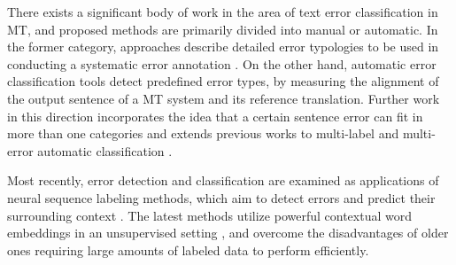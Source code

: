 There exists a significant body of work in the area of text error classification in MT, and proposed methods are primarily divided into manual or automatic. In the former category, approaches describe detailed error typologies to be used in conducting a systematic error annotation \cite{fishel2011automatic,vilar2006error, lommel2014multidimensional, farrus2010linguistic, costa2015linguistically}. On the other hand,  automatic error classification tools \cite{zeman2011addicter, popovic2011hjerson,popovic2015poor} detect predefined error types, by measuring the alignment of the output sentence of a MT system and its reference translation. Further work in this direction incorporates the idea that a certain sentence error can fit in more than one categories \cite{klubivcka2018quantitative, lommel2014assessing} and extends previous works to multi-label and multi-error automatic classification \citep{popovic2019automatic}. 

Most recently, error detection and classification are examined as applications of neural sequence labeling methods, which aim to detect errors and predict their surrounding context \cite{rei2017semi}. The latest methods utilize powerful contextual word embeddings in an unsupervised setting \cite{bell2019context}, and overcome the disadvantages of older ones requiring large amounts of labeled data to perform efficiently.